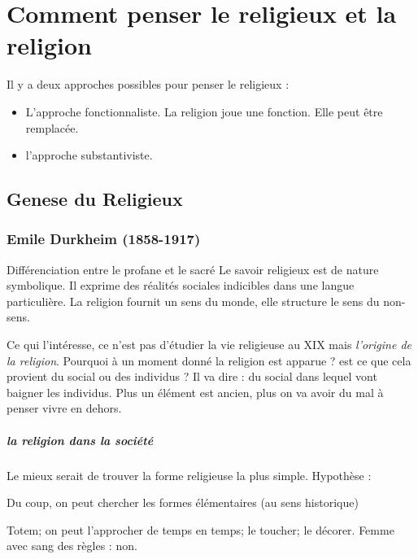 \chapter{Comment penser le religieux et la religion}




Il y a deux approches possibles pour penser le religieux : 
\begin{itemize}
    \item L'approche fonctionnaliste. La religion joue une fonction. Elle peut être remplacée.
    \item l'approche  substantiviste.
\end{itemize}
 \section{Genese du Religieux}

 \subsection{Emile Durkheim (1858-1917) }
 
 Différenciation entre le profane et le sacré  Le savoir religieux est de nature symbolique. Il exprime des réalités sociales indicibles dans une langue particulière.  La religion fournit un sens du monde, elle structure le sens du non-sens.  

 Ce qui l'intéresse, ce n'est pas d'étudier la vie religieuse au XIX mais \textit{l'origine de la religion}. Pourquoi à un moment donné la religion est apparue ?  est ce que cela provient du social ou des individus ? Il va dire : du social dans lequel vont baigner les individus. Plus un élément est ancien, plus on va avoir du mal à penser vivre en dehors.

 \paragraph{la religion dans la société} Le mieux serait de trouver la forme religieuse la plus simple. Hypothèse :
 \begin{Prop}
 Du coup, on peut chercher les formes élémentaires (au sens historique)
 \end{Prop}

\begin{Ex}
    Totem; on peut l'approcher de temps en temps; le toucher; le décorer.
    Femme avec sang des règles : non.
\end{Ex}
 
